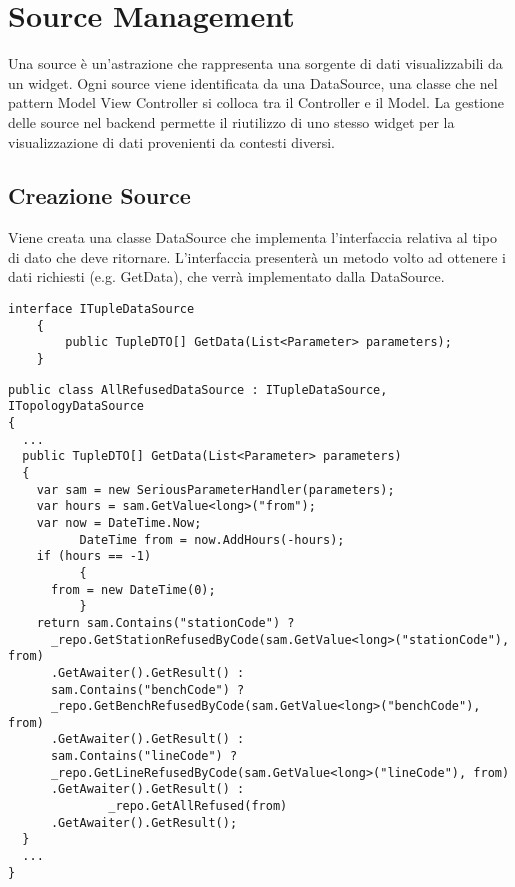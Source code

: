 \chapter{Source Management}

Una source è un'astrazione che rappresenta una sorgente di dati visualizzabili da un widget. Ogni source viene identificata da una DataSource, una classe che nel pattern Model View Controller si colloca tra il Controller e il Model. La gestione delle source nel backend permette il riutilizzo di uno stesso widget per la visualizzazione di dati provenienti da contesti diversi.

\section{Creazione Source}
Viene creata una classe DataSource che implementa l’interfaccia relativa al tipo di dato che deve ritornare. L'interfaccia presenterà un metodo volto ad ottenere i dati richiesti (e.g. GetData), che verrà implementato dalla DataSource.
\begin{lstlisting}[caption={ITupleDataSource.cs}, style=sharpCode]
interface ITupleDataSource
    {
        public TupleDTO[] GetData(List<Parameter> parameters);
    }
\end{lstlisting}
\begin{lstlisting}[caption={TupleDataSource.cs}, style=sharpCode]
public class AllRefusedDataSource : ITupleDataSource, ITopologyDataSource
{
  ...
  public TupleDTO[] GetData(List<Parameter> parameters)
  {
    var sam = new SeriousParameterHandler(parameters);
    var hours = sam.GetValue<long>("from");
    var now = DateTime.Now;
          DateTime from = now.AddHours(-hours);
    if (hours == -1)
          {
      from = new DateTime(0);
          }
    return sam.Contains("stationCode") ? 
      _repo.GetStationRefusedByCode(sam.GetValue<long>("stationCode"), from)
      .GetAwaiter().GetResult() :
      sam.Contains("benchCode") ? 
      _repo.GetBenchRefusedByCode(sam.GetValue<long>("benchCode"), from)
      .GetAwaiter().GetResult() :
      sam.Contains("lineCode") ?
      _repo.GetLineRefusedByCode(sam.GetValue<long>("lineCode"), from)
      .GetAwaiter().GetResult() :
              _repo.GetAllRefused(from)
      .GetAwaiter().GetResult();
  }
  ...
}
\end{lstlisting}

